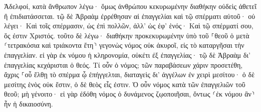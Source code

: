 \documentclass{openreader}
\begin{document}
Ἀδελφοί, κατὰ ἄνθρωπον λέγω· ὅμως ἀνθρώπου κεκυρωμένην διαθήκην οὐδεὶς ἀθετεῖ ἢ ἐπιδιατάσσεται. 
τῷ δὲ Ἀβραὰμ ἐρρέθησαν αἱ ἐπαγγελίαι καὶ τῷ σπέρματι αὐτοῦ· οὐ λέγει· Καὶ τοῖς σπέρμασιν, ὡς ἐπὶ πολλῶν, ἀλλ’ ὡς ἐφ’ ἑνός· Καὶ τῷ σπέρματί σου, ὅς ἐστιν Χριστός. 
τοῦτο δὲ λέγω· διαθήκην προκεκυρωμένην ὑπὸ τοῦ ⸀θεοῦ ὁ μετὰ ⸂τετρακόσια καὶ τριάκοντα ἔτη⸃ γεγονὼς νόμος οὐκ ἀκυροῖ, εἰς τὸ καταργῆσαι τὴν ἐπαγγελίαν. 
εἰ γὰρ ἐκ νόμου ἡ κληρονομία, οὐκέτι ἐξ ἐπαγγελίας· τῷ δὲ Ἀβραὰμ δι’ ἐπαγγελίας κεχάρισται ὁ θεός. 
Τί οὖν ὁ νόμος; τῶν παραβάσεων χάριν προσετέθη, ἄχρις ⸀οὗ ἔλθῃ τὸ σπέρμα ᾧ ἐπήγγελται, διαταγεὶς δι’ ἀγγέλων ἐν χειρὶ μεσίτου· 
ὁ δὲ μεσίτης ἑνὸς οὐκ ἔστιν, ὁ δὲ θεὸς εἷς ἐστιν. 
Ὁ οὖν νόμος κατὰ τῶν ἐπαγγελιῶν τοῦ θεοῦ; μὴ γένοιτο· εἰ γὰρ ἐδόθη νόμος ὁ δυνάμενος ζῳοποιῆσαι, ὄντως ⸂ἐκ νόμου ἂν⸃ ἦν ἡ δικαιοσύνη. 
\end{document}

